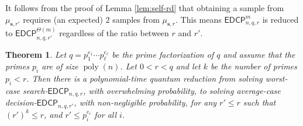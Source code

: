 \documentclass[11pt]{article}
\theoremstyle{plain}
\newtheorem{theorem}{Theorem}
\theoremstyle{definition}
\DeclareMathOperator{\poly}{poly}
\def\edcp{\mathsf{EDCP}}
\begin{document}
It follows from the proof of Lemma \ref{lem:self-rd} that obtaining a sample from $\mu_{\bm{s}, r'}$ requires (an expected) $2$ samples from $\mu_{\bm{s}, r}$. This means $\edcp_{n, q, r}^m$ is reduced to $\edcp_{n, q, r'}^{\Theta(m)}$ regardless of the ratio between $r$ and $r'$.

\begin{theorem}
    Let $q = p_1^{e_1} \cdots p_\ell^{e_\ell}$ be the prime factorization of $q$ and assume that the primes $p_i$ are of size $\poly(n)$. Let $0 < r < q$ and let $k$ be the number of primes $p_i < r$. Then there is a polynomial-time quantum reduction from solving worst-case search-$\edcp_{n, q, r}$, with overwhelming probability, to solving average-case decision-$\edcp_{n, q, r'}$, with non-negligible probability, for any $r' \le r$ such that $(r')^k \le r$, and $r' \le p_i^{e_i}$ for all $i$. 
\end{theorem}
\end{document}
